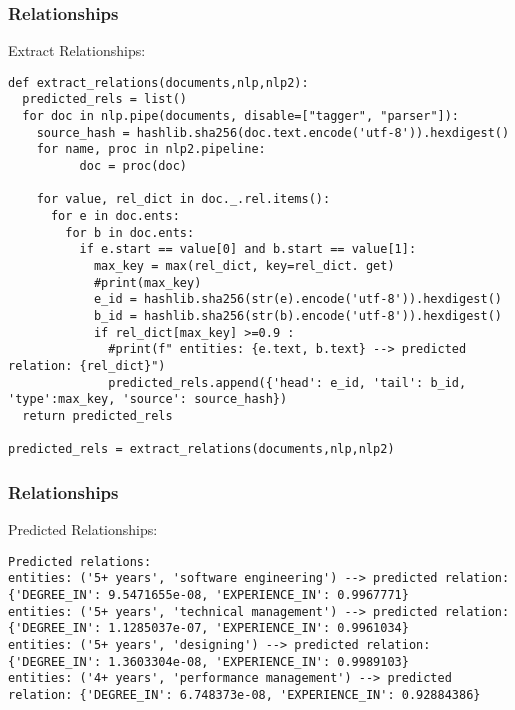 \begin{frame}[fragile]\frametitle{Relationships}

Extract Relationships:

\begin{lstlisting}
def extract_relations(documents,nlp,nlp2):
  predicted_rels = list()
  for doc in nlp.pipe(documents, disable=["tagger", "parser"]):
    source_hash = hashlib.sha256(doc.text.encode('utf-8')).hexdigest()
    for name, proc in nlp2.pipeline:
          doc = proc(doc)

    for value, rel_dict in doc._.rel.items():
      for e in doc.ents:
        for b in doc.ents:
          if e.start == value[0] and b.start == value[1]:
            max_key = max(rel_dict, key=rel_dict. get)
            #print(max_key)
            e_id = hashlib.sha256(str(e).encode('utf-8')).hexdigest()
            b_id = hashlib.sha256(str(b).encode('utf-8')).hexdigest()
            if rel_dict[max_key] >=0.9 :
              #print(f" entities: {e.text, b.text} --> predicted relation: {rel_dict}")
              predicted_rels.append({'head': e_id, 'tail': b_id, 'type':max_key, 'source': source_hash})
  return predicted_rels

predicted_rels = extract_relations(documents,nlp,nlp2)
\end{lstlisting}
	 
\end{frame}


\begin{frame}[fragile]\frametitle{Relationships}

Predicted Relationships:

\begin{lstlisting}
Predicted relations:  
entities: ('5+ years', 'software engineering') --> predicted relation: {'DEGREE_IN': 9.5471655e-08, 'EXPERIENCE_IN': 0.9967771}  
entities: ('5+ years', 'technical management') --> predicted relation: {'DEGREE_IN': 1.1285037e-07, 'EXPERIENCE_IN': 0.9961034}  
entities: ('5+ years', 'designing') --> predicted relation: {'DEGREE_IN': 1.3603304e-08, 'EXPERIENCE_IN': 0.9989103}  
entities: ('4+ years', 'performance management') --> predicted relation: {'DEGREE_IN': 6.748373e-08, 'EXPERIENCE_IN': 0.92884386}
\end{lstlisting}
	 
\end{frame}



